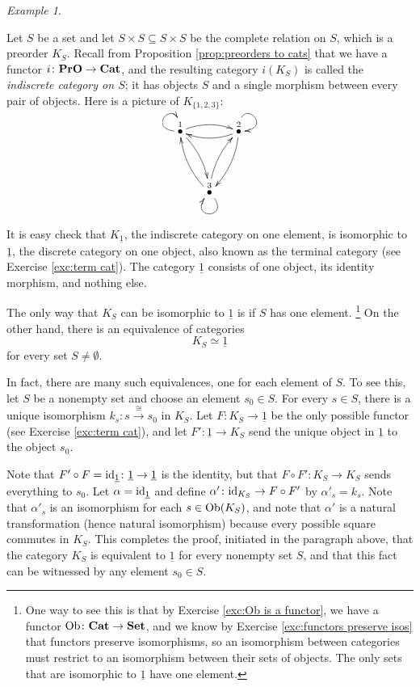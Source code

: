 \documentclass{book}
\def\tn{\textnormal}
\def\Ob{\tn{Ob}}
\def\to{\rightarrow}
\def\taking{\colon}
\def\ss{\subseteq}
\def\iso{\cong}
\def\ul{\underline}
\newcommand{\LMO}[1]{\stackrel{#1}{\bullet}}
\newcommand{\To}[1]{\xrightarrow{#1}}
\def\id{\tn{id}}
\def\Cat{{\bf Cat}}
\def\Set{{\bf Set}}
\def\PrO{{\bf PrO}}
\theoremstyle{remark}
\newtheorem{example}[subsubsection]{Example}
\theoremstyle{definition}
\begin{document}
\begin{example}\label{ex:indiscrete cat equiv to terminal}

Let $S$ be a set and let $S\times S\ss S\times S$ be the complete relation on $S$, which is a preorder $K_S$. Recall from Proposition \ref{prop:preorders to cats} that we have a functor $i\taking\PrO\to\Cat$,\index{a functor!$\PrO\to\Cat$} and the resulting category $i(K_S)$ is called the {\em indiscrete category on $S$}; it has objects $S$ and a single morphism between every pair of objects. Here is a picture of $K_{\{1,2,3\}}$:
$$\xymatrix@=15pt{\LMO{1}\ar@(l,u)[]\ar@/^.5pc/[rr]\ar@/^.5pc/[rdd]&&\LMO{2}\ar@(u,r)[]\ar@/^.5pc/[ll]\ar@/^.5pc/[ldd]\\\\&\LMO{3}\ar@(dr,dl)[]_~\ar@/^.5pc/[uur]\ar@/^.5pc/[uul]}$$

It is easy check that $K_{\ul{1}}$, the indiscrete category on one element, is isomorphic to $\ul{1}$, the discrete category on one object, also known as the terminal category (see Exercise \ref{exc:term cat}). The category $\ul{1}$ consists of one object, its identity morphism, and nothing else. 

The only way that $K_S$ can be isomorphic to $\ul{1}$ is if $S$ has one element.
\footnote{One way to see this is that by Exercise \ref{exc:Ob is a functor}, we have a functor $\Ob\taking\Cat\to\Set$, and we know by Exercise \ref{exc:functors preserve isos} that functors preserve isomorphisms, so an isomorphism between categories must restrict to an isomorphism between their sets of objects. The only sets that are isomorphic to $\ul{1}$ have one element.} 
On the other hand, there is an equivalence of categories $$K_S\simeq\ul{1}$$ for every set $S\neq\emptyset$. 

In fact, there are many such equivalences, one for each element of $S$. To see this, let $S$ be a nonempty set and choose an element $s_0\in S$. For every $s\in S$, there is a unique isomorphism $k_s\taking s\To{\iso}s_0$ in $K_S$. Let $F\taking K_S\to\ul{1}$ be the only possible functor (see Exercise \ref{exc:term cat}), and let $F'\taking\ul{1}\to K_S$ send the unique object in $\ul{1}$ to the object $s_0$. 

Note that $F'\circ F=\id_{\ul{1}}\taking\ul{1}\to\ul{1}$ is the identity, but that $F\circ F'\taking K_S\to K_S$ sends everything to $s_0$. Let $\alpha=\id_{\ul{1}}$ and define $\alpha'\taking\id_{K_S}\to F\circ F'$ by $\alpha'_s=k_s$. Note that $\alpha'_s$ is an isomorphism for each $s\in\Ob(K_S)$, and note that $\alpha'$ is a natural transformation (hence natural isomorphism) because every possible square commutes in $K_S$. This completes the proof, initiated in the paragraph above, that the category $K_S$ is equivalent to $\ul{1}$ for every nonempty set $S$, and that this fact can be witnessed by any element $s_0\in S$.

\end{example}
\end{document}
